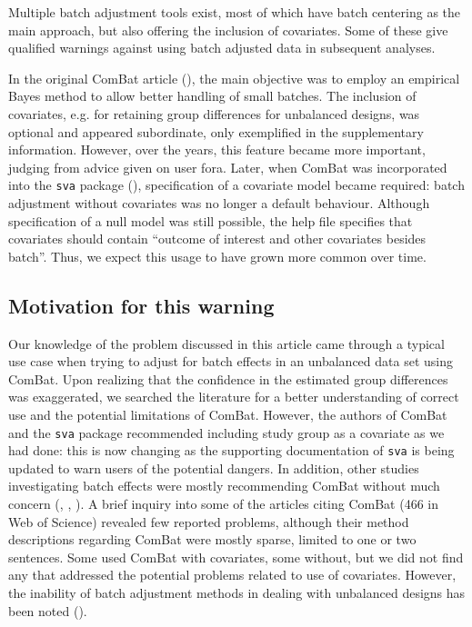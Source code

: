 \documentclass{bio}
\begin{document}
Multiple batch adjustment tools exist, most of which have batch centering as the main approach, but also offering the inclusion of covariates. Some of these give qualified warnings against using batch adjusted data in subsequent analyses.

In the original ComBat article (\citealp{Johnson2007}), the main objective was to employ an empirical Bayes method to allow better handling of small batches. The inclusion of covariates, e.g. for retaining group differences for unbalanced designs, was optional and appeared subordinate, only exemplified in the supplementary information. However, over the years, this feature became more important, judging from advice given on user fora.
Later, when ComBat was incorporated into the \texttt{sva} package (\citealp{Leek2012}), specification of a covariate model became required: batch adjustment without covariates was no longer a default behaviour. Although specification of a null model was still possible, the help file specifies that covariates should contain ``outcome of interest and other covariates besides batch''. Thus, we expect this usage to have grown more common over time.

\subsection{Motivation for this warning}

Our knowledge of the problem discussed in this article came through a typical use case when trying to adjust for batch effects in an unbalanced data set using ComBat. Upon realizing that the confidence in the estimated group differences was exaggerated, we searched the literature for a better understanding of correct use and the potential limitations of ComBat. However, the authors of ComBat and the \texttt{sva} package recommended including study group as a covariate as we had done: this is now changing as the supporting documentation of \texttt{sva} is being updated to warn users of the potential dangers. In addition, other studies investigating batch effects were mostly recommending ComBat without much concern (\citealp{Kupfer2012}, \citealp{Kitchen2011}, \citealp{Chen2011}). A brief inquiry into some of the articles citing ComBat (466 in Web of Science) revealed few reported problems, although their method descriptions regarding ComBat were mostly sparse, limited to one or two sentences. Some used ComBat with covariates, some without, but we did not find any that addressed the potential problems related to use of covariates. However, the inability of batch adjustment methods in dealing with unbalanced designs has been noted (\citealp{Buhule2014}).
\end{document}
